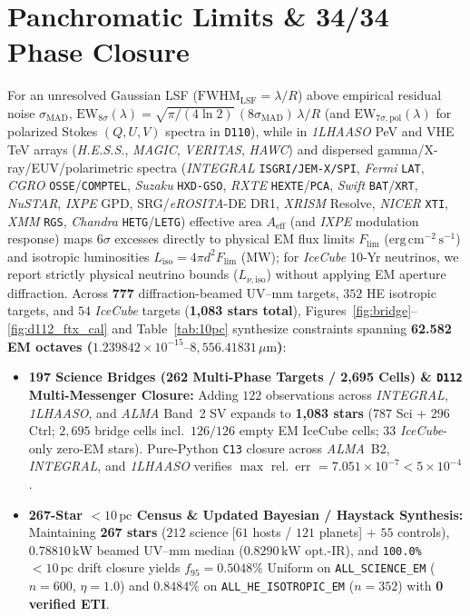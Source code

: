 \documentclass[twocolumn,10pt]{article}
\begin{document}
\clearpage
\section{Panchromatic Limits \& 34/34 Phase Closure}
For an unresolved Gaussian LSF ($\mathrm{FWHM}_{\mathrm{LSF}} = \lambda/R$) above empirical residual noise $\sigma_{\mathrm{MAD}}$, $\mathrm{EW}_{8\sigma}(\lambda) = \sqrt{\pi/(4\ln 2)}\,(8\sigma_{\mathrm{MAD}})\,\lambda/R$ (and $\mathrm{EW}_{7\sigma,\mathrm{pol}}(\lambda)$ for polarized Stokes $(Q, U, V)$ spectra in \texttt{D110}), while in \textit{1LHAASO} PeV and VHE TeV arrays (\textit{H.E.S.S.}, \textit{MAGIC}, \textit{VERITAS}, \textit{HAWC}) and dispersed gamma/X-ray/EUV/polarimetric spectra (\textit{INTEGRAL} \texttt{ISGRI/JEM-X/SPI}, \textit{Fermi} \texttt{LAT}, \textit{CGRO} \texttt{OSSE}/\texttt{COMPTEL}, \textit{Suzaku} \texttt{HXD-GSO}, \textit{RXTE} \texttt{HEXTE}/\texttt{PCA}, \textit{Swift} \texttt{BAT}/\texttt{XRT}, \textit{NuSTAR}, \textit{IXPE} GPD, SRG/\textit{eROSITA}-DE DR1, \textit{XRISM} Resolve, \textit{NICER} \texttt{XTI}, \textit{XMM} \texttt{RGS}, \textit{Chandra} \texttt{HETG}/\texttt{LETG}) effective area $A_{\mathrm{eff}}$ (and \textit{IXPE} modulation response) maps $6\sigma$ excesses directly to physical EM flux limits $F_{\mathrm{lim}}$ ($\mathrm{erg\,cm^{-2}\,s^{-1}}$) and isotropic luminosities $L_{\mathrm{iso}} = 4\pi d^2 F_{\mathrm{lim}}$ ($\mathrm{MW}$); for \textit{IceCube} 10-Yr neutrinos, we report strictly physical neutrino bounds ($L_{\nu,\mathrm{iso}}$) without applying EM aperture diffraction. Across \textbf{777} diffraction-beamed UV--mm targets, $352$ HE isotropic targets, and $54$ \textit{IceCube} targets (\textbf{1,083 stars total}), Figures~\ref{fig:bridge}--\ref{fig:d112_ftx_cal} and Table~\ref{tab:10pc} synthesize constraints spanning \textbf{62.582 EM octaves ($1.239842\times 10^{-15}\text{--}8{,}556.41831\,\mu\text{m}$)}:
\begin{itemize}
  \item \textbf{197 Science Bridges (262 Multi-Phase Targets / 2,695 Cells) \& \texttt{D112} Multi-Messenger Closure:} Adding $122$ observations across \textit{INTEGRAL}, \textit{1LHAASO}, and \textit{ALMA} Band~2 SV expands to \textbf{1,083 stars} ($787$ Sci + $296$ Ctrl; $2{,}695$ bridge cells incl.\ $126/126$ empty EM IceCube cells; $33$ \textit{IceCube}-only zero-EM stars). Pure-Python \texttt{C13} closure across \textit{ALMA}~B2, \textit{INTEGRAL}, and \textit{1LHAASO} verifies $\max$ rel.\ err $= 7.051\times 10^{-7} < 5\times 10^{-4}$.
  \item \textbf{267-Star $<10\,\text{pc}$ Census \& Updated Bayesian / Haystack Synthesis:} Maintaining \textbf{267 stars} ($212$ science [$61$ hosts / $121$ planets] + $55$ controls), $0.78810\,\mathrm{kW}$ beamed UV--mm median ($0.8290\,\mathrm{kW}$ opt.-IR), and \texttt{100.0\%} $<10\,\text{pc}$ drift closure yields $f_{95} = \mathbf{0.5048\%}$ Uniform on \texttt{ALL\_SCIENCE\_EM} ($n=600$, $\eta=1.0$) and $\mathbf{0.8484\%}$ on \texttt{ALL\_HE\_ISOTROPIC\_EM} ($n=352$) with \textbf{0 verified ETI}.
\end{itemize}
\end{document}
